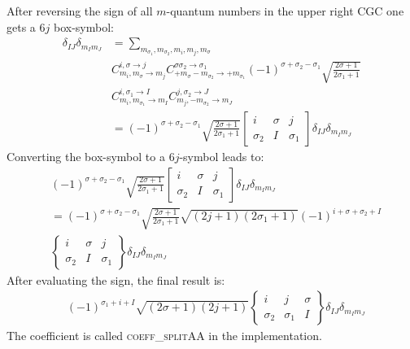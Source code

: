 \documentclass[a4paper,10pt,parskip=full]{scrartcl}
\begin{document}
After reversing the sign of all $m$-quantum numbers in the upper right
CGC one gets a $6j$ box-symbol:
\begin{equation}
  \begin{split}
    \delta_{IJ}\delta_{m_Im_J}&=
    \sum_{m_{\sigma_1},m_{\sigma_2},m_{i},m_j,m_{\sigma}}\\
    &C^{i,\sigma\rightarrow j}_{m_{i},m_{\sigma}\rightarrow m_{j}}
    C^{\sigma\sigma_2\rightarrow\sigma_1}_{+m_{\sigma}-m_{\sigma_2}\rightarrow +m_{\sigma_1}}(-1)^{\sigma+\sigma_2-\sigma_1}\sqrt{\frac{2\sigma+1}{2\sigma_1+1}}\\
    &C^{i,\sigma_1\rightarrow I}_{m_i,m_{\sigma_1}\rightarrow m_{I}}
    C^{j,\sigma_2\rightarrow J}_{m_j,-m_{\sigma_2}\rightarrow m_{J}}\\
    &=(-1)^{\sigma+\sigma_2-\sigma_1}\sqrt{\frac{2\sigma+1}{2\sigma_1+1}}
    \begin{bmatrix}
      i & \sigma & j \\
      \sigma_2 & I & \sigma_1
    \end{bmatrix}\delta_{IJ}\delta_{m_Im_J}
  \end{split}
\end{equation}
Converting the box-symbol to a $6j$-symbol leads to:
\begin{equation}
  \begin{split}
    &(-1)^{\sigma+\sigma_2-\sigma_1}\sqrt{\frac{2\sigma+1}{2\sigma_1+1}}
    \begin{bmatrix}
      i & \sigma & j \\
      \sigma_2 & I & \sigma_1
    \end{bmatrix}\delta_{IJ}\delta_{m_Im_J}\\
    &=(-1)^{\sigma+\sigma_2-\sigma_1}\sqrt{\frac{2\sigma+1}{2\sigma_1+1}}\sqrt{(2j+1)(2\sigma_1+1)}(-1)^{i+\sigma+\sigma_2+I}\\
    &\begin{Bmatrix}
      i & \sigma & j \\
      \sigma_2 & I & \sigma_1
    \end{Bmatrix}\delta_{IJ}\delta_{m_Im_J}
  \end{split}
\end{equation}
After evaluating the sign, the final result is:
\begin{equation}
  \begin{split}
    &(-1)^{\sigma_1+i+I}\sqrt{(2\sigma+1)(2j+1)}
    \begin{Bmatrix}
      i & j & \sigma \\
      \sigma_2 & \sigma_1 & I
    \end{Bmatrix}\delta_{IJ}\delta_{m_Im_J}
  \end{split}
\end{equation}
The coefficient is called \textsc{coeff\_splitAA} in the
implementation.
\end{document}
